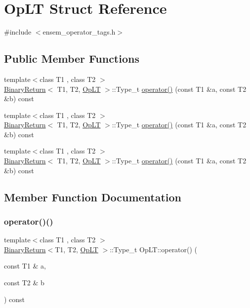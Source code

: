\hypertarget{structOpLT}{}\section{Op\+LT Struct Reference}
\label{structOpLT}


{\ttfamily \#include $<$ensem\+\_\+operator\+\_\+tags.\+h$>$}

\subsection*{Public Member Functions}
\begin{DoxyCompactItemize}
\item 
{\footnotesize template$<$class T1 , class T2 $>$ }\\\mbox{\hyperlink{structBinaryReturn}{Binary\+Return}}$<$ T1, T2, \mbox{\hyperlink{structOpLT}{Op\+LT}} $>$\+::Type\+\_\+t \mbox{\hyperlink{structOpLT_a2f128753d950366b68138d206e76ceec}{operator()}} (const T1 \&a, const T2 \&b) const
\item 
{\footnotesize template$<$class T1 , class T2 $>$ }\\\mbox{\hyperlink{structBinaryReturn}{Binary\+Return}}$<$ T1, T2, \mbox{\hyperlink{structOpLT}{Op\+LT}} $>$\+::Type\+\_\+t \mbox{\hyperlink{structOpLT_a2f128753d950366b68138d206e76ceec}{operator()}} (const T1 \&a, const T2 \&b) const
\item 
{\footnotesize template$<$class T1 , class T2 $>$ }\\\mbox{\hyperlink{structBinaryReturn}{Binary\+Return}}$<$ T1, T2, \mbox{\hyperlink{structOpLT}{Op\+LT}} $>$\+::Type\+\_\+t \mbox{\hyperlink{structOpLT_a2f128753d950366b68138d206e76ceec}{operator()}} (const T1 \&a, const T2 \&b) const
\end{DoxyCompactItemize}


\subsection{Member Function Documentation}
\mbox{\label{structOpLT_a2f128753d950366b68138d206e76ceec}} 
\subsubsection{\texorpdfstring{operator()()}{operator()()}\hspace{0.1cm}{\footnotesize\ttfamily [1/3]}}
{\footnotesize\ttfamily template$<$class T1 , class T2 $>$ \\
\mbox{\hyperlink{structBinaryReturn}{Binary\+Return}}$<$T1, T2, \mbox{\hyperlink{structOpLT}{Op\+LT}} $>$\+::Type\+\_\+t Op\+L\+T\+::operator() (\begin{DoxyParamCaption}\item[{const T1 \&}]{a,  }\item[{const T2 \&}]{b }\end{DoxyParamCaption}) const\hspace{0.3cm}{\ttfamily [inline]}}

